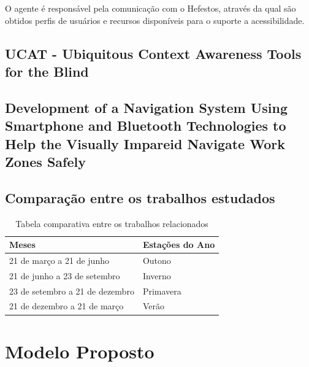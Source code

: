 \documentclass[english,brazilian]{UNISINOSmonografia}
\begin{document}
	O agente é responsável pela comunicação com o Hefestos, através da qual são obtidos perfis de usuários e recursos disponíveis para o suporte a acessibilidade. 




	\section{UCAT - Ubiquitous Context Awareness Tools for the Blind}

	\section{Development of a Navigation System Using Smartphone and Bluetooth Technologies to Help the Visually Impareid Navigate Work Zones Safely} %
	
	\section{Comparação entre os trabalhos estudados}\label{comparacaoTrabs}
\begin{table}
	\caption{Tabela comparativa entre os trabalhos relacionados}
	\centering%
	\begin{minipage}{.6\textwidth}
		\begin{tabular*}{\textwidth}{ll}
			\hline
			\textbf{Meses} & \textbf{Estações do Ano}\\
			\hline
			21 de março a 21 de junho & Outono\\
			21 de junho a 23 de setembro & Inverno\\
			23 de setembro a 21 de dezembro & Primavera\\
			21 de dezembro a 21 de março & Verão\\
			\hline
		\end{tabular*}
	\end{minipage}
\end{table}


\chapter{Modelo Proposto}
\end{document}
